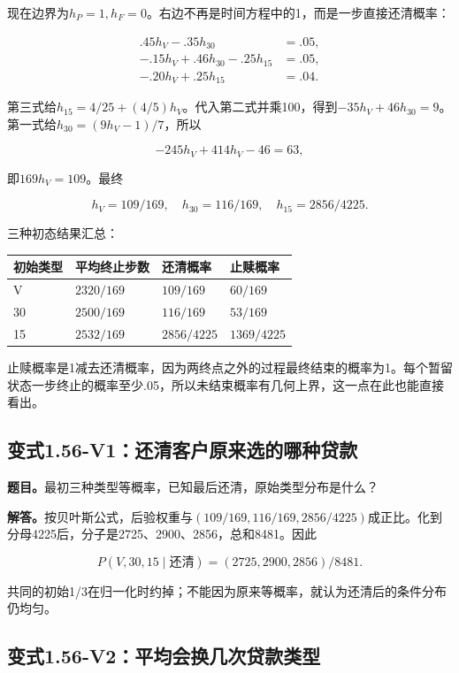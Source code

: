 \documentclass[
  11pt,
  a4paper,
  UTF8,
  fontset=fandol]{ctexart}
\begin{document}
现在边界为\(h_P=1,h_F=0\)。右边不再是时间方程中的1，而是一步直接还清概率：

\[
\begin{aligned}
.45h_V-.35h_{30}&=.05,\\
-.15h_V+.46h_{30}-.25h_{15}&=.05,\\
-.20h_V+.25h_{15}&=.04.
\end{aligned}
\]

第三式给\(h_{15}=4/25+(4/5)h_V\)。代入第二式并乘100，得到\(-35h_V+46h_{30}=9\)。第一式给\(h_{30}=(9h_V-1)/7\)，所以

\[
-245h_V+414h_V-46=63,
\]

即\(169h_V=109\)。最终

\[
\boxed{h_V=109/169,\quad h_{30}=116/169,\quad h_{15}=2856/4225.}
\]

三种初态结果汇总：

\begin{longtable}[]{@{}llll@{}}
\toprule\noalign{}
初始类型 & 平均终止步数 & 还清概率 & 止赎概率 \\
\midrule\noalign{}
\endhead
\bottomrule\noalign{}
\endlastfoot
V & \(2320/169\) & \(109/169\) & \(60/169\) \\
30 & \(2500/169\) & \(116/169\) & \(53/169\) \\
15 & \(2532/169\) & \(2856/4225\) & \(1369/4225\) \\
\end{longtable}

止赎概率是1减去还清概率，因为两终点之外的过程最终结束的概率为1。每个暂留状态一步终止的概率至少.05，所以未结束概率有几何上界，这一点在此也能直接看出。

\subsection{变式1.56-V1：还清客户原来选的哪种贷款}\label{ux53d8ux5f0f1.56-v1ux8fd8ux6e05ux5ba2ux6237ux539fux6765ux9009ux7684ux54eaux79cdux8d37ux6b3e}

\textbf{题目。}最初三种类型等概率，已知最后还清，原始类型分布是什么？

\textbf{解答。}按贝叶斯公式，后验权重与\((109/169,116/169,2856/4225)\)成正比。化到分母4225后，分子是2725、2900、2856，总和8481。因此

\[
\boxed{P(V,30,15\mid\text{还清})=(2725,2900,2856)/8481.}
\]

共同的初始1/3在归一化时约掉；不能因为原来等概率，就认为还清后的条件分布仍均匀。

\subsection{变式1.56-V2：平均会换几次贷款类型}\label{ux53d8ux5f0f1.56-v2ux5e73ux5747ux4f1aux6362ux51e0ux6b21ux8d37ux6b3eux7c7bux578b}
\end{document}
